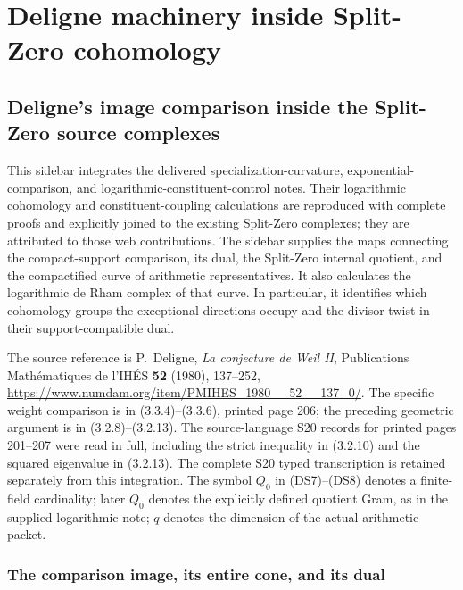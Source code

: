 \begingroup

\section{Deligne machinery inside Split-Zero cohomology}


\subsection{Deligne's image comparison inside the Split-Zero source complexes}
\label{sec:deligne-split-sidebar}

This sidebar integrates the delivered specialization-curvature, exponential-comparison,
and logarithmic-constituent-control notes. Their logarithmic cohomology and
constituent-coupling calculations are reproduced with complete proofs and
explicitly joined to the existing Split-Zero complexes; they are attributed
to those web contributions. The sidebar supplies the maps connecting the compact-support comparison,
its dual, the Split-Zero internal quotient, and the compactified curve of
arithmetic representatives.  It also calculates the logarithmic de Rham
complex of that curve.  In particular, it identifies which cohomology
groups the exceptional directions occupy and the divisor twist in their
support-compatible dual.

The source reference is P.~Deligne, \emph{La conjecture de Weil II},
Publications Math\'ematiques de l'IH\'ES \textbf{52} (1980), 137--252,
\url{https://www.numdam.org/item/PMIHES_1980__52__137_0/}.
The specific weight comparison is in (3.3.4)--(3.3.6), printed page 206;
the preceding geometric argument is in (3.2.8)--(3.2.13).
The source-language S20 records for printed pages 201--207 were read in full,
including the strict inequality in (3.2.10) and the squared eigenvalue in
(3.2.13). The complete S20 typed transcription is retained separately from
this integration.  The symbol $Q_0$ in (DS7)--(DS8) denotes a finite-field
cardinality; later $Q_0$ denotes the explicitly defined quotient Gram,
as in the supplied logarithmic note; $q$ denotes the dimension of the actual arithmetic packet.

\subsubsection{The comparison image, its entire cone, and its dual}

